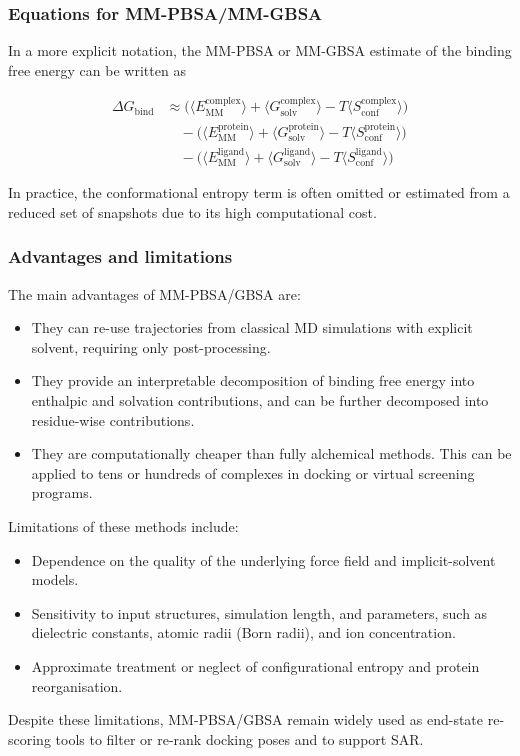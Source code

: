 \documentclass[12pt]{article}
\begin{document}
\subsubsection{Equations for MM-PBSA/MM-GBSA}

In a more explicit notation, the MM-PBSA or MM-GBSA estimate of the binding free energy can be written as

\begin{equation}
\begin{aligned}
\Delta G_\mathrm{bind} 
&\approx 
\big( \langle E_\mathrm{MM}^\mathrm{complex} \rangle 
+ \langle G_\mathrm{solv}^\mathrm{complex} \rangle 
- T \langle S_\mathrm{conf}^\mathrm{complex} \rangle \big) \\
&\quad - 
\big( \langle E_\mathrm{MM}^\mathrm{protein} \rangle 
+ \langle G_\mathrm{solv}^\mathrm{protein} \rangle 
- T \langle S_\mathrm{conf}^\mathrm{protein} \rangle \big) \\
&\quad - 
\big( \langle E_\mathrm{MM}^\mathrm{ligand} \rangle 
+ \langle G_\mathrm{solv}^\mathrm{ligand} \rangle 
- T \langle S_\mathrm{conf}^\mathrm{ligand} \rangle \big)
\end{aligned}
\end{equation}

In practice, the conformational entropy term is often omitted or estimated from a reduced set of snapshots due to its high computational cost. 

\subsubsection{Advantages and limitations}

The main advantages of MM-PBSA/GBSA are:
\begin{itemize}
  \item They can re-use trajectories from classical MD simulations with explicit solvent, requiring only post-processing.
  \item They provide an interpretable decomposition of binding free energy into enthalpic and solvation contributions, and can be further decomposed into residue-wise contributions.
  \item They are computationally cheaper than fully alchemical methods. This can be applied to tens or hundreds of complexes in docking or virtual screening programs\cite{CH10_homeyer2012mmpbsa}. 
\end{itemize}

Limitations of these methods include:
\begin{itemize}
  \item Dependence on the quality of the underlying force field and implicit-solvent models.
  \item Sensitivity to input structures, simulation length, and parameters, such as dielectric constants, atomic radii (Born radii\cite{CH10_onufriev2002effective}), and ion concentration.
  \item Approximate treatment or neglect of configurational entropy and protein reorganisation.
\end{itemize}
Despite these limitations, MM-PBSA/GBSA remain widely used as end-state re-scoring tools to filter or re-rank docking poses and to support SAR. 
\end{document}
